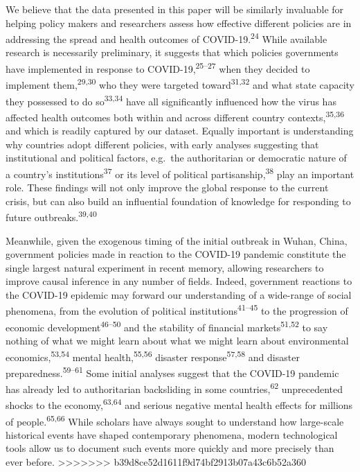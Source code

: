 \documentclass[]{article}
\begin{document}
We believe that the data presented in this paper will be similarly invaluable for helping policy makers and researchers assess how effective different policies are in addressing the spread and health outcomes of COVID-19.\textsuperscript{24} While available research is necessarily preliminary, it suggests that which policies governments have implemented in response to COVID-19,\textsuperscript{25--27} when they decided to implement them,\textsuperscript{29,30} who they were targeted toward\textsuperscript{31,32} and what state capacity they possessed to do so\textsuperscript{33,34} have all significantly influenced how the virus has affected health outcomes both within and across different country contexts,\textsuperscript{35,36} and which is readily captured by our dataset. Equally important is understanding why countries adopt different policies, with early analyses suggesting that institutional and political factors, e.g.~the authoritarian or democratic nature of a country's institutions\textsuperscript{37} or its level of political partisanship,\textsuperscript{38} play an important role. These findings will not only improve the global response to the current crisis, but can also build an influential foundation of knowledge for responding to future outbreaks.\textsuperscript{39,40}

Meanwhile, given the exogenous timing of the initial outbreak in Wuhan, China, government policies made in reaction to the COVID-19 pandemic constitute the single largest natural experiment in recent memory, allowing researchers to improve causal inference in any number of fields. Indeed, government reactions to the COVID-19 epidemic may forward our understanding of a wide-range of social phenomena, from the evolution of political institutions\textsuperscript{41--45} to the progression of economic development\textsuperscript{46--50} and the stability of financial markets\textsuperscript{51,52} to say nothing of what we might learn about what we might learn about environmental economics,\textsuperscript{53,54} mental health,\textsuperscript{55,56} disaster response\textsuperscript{57,58} and disaster preparedness.\textsuperscript{59--61} Some initial analyses suggest that the COVID-19 pandemic has already led to authoritarian backsliding in some countries,\textsuperscript{62} unprecedented shocks to the economy,\textsuperscript{63,64} and serious negative mental health effects for millions of people.\textsuperscript{65,66} While scholars have always sought to understand how large-scale historical events have shaped contemporary phenomena, modern technological tools allow us to document such events more quickly and more precisely than ever before.
>>>>>>> b39d8ce52d1611f9d74bf2913b07a43c6b52a360
\end{document}
